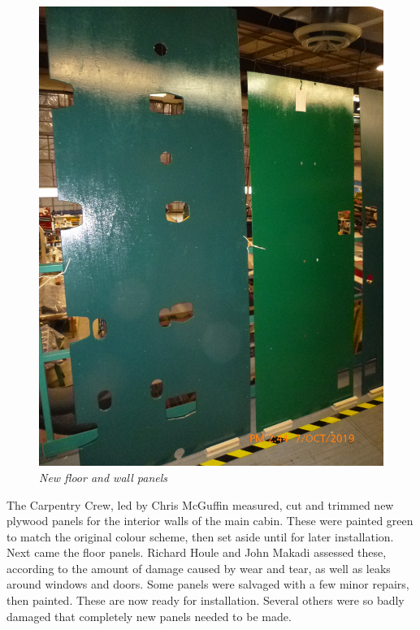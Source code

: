\begin{figure}[httb]
   \vspace{2em}
   \centering
   \includegraphics [scale=0.5]{New-Floor-Wall-Panels-feb-2020.png}
   \caption*{\small \em New floor and wall panels}
   \label{fig:wall-two}
\end{figure}

The Carpentry Crew, led by Chris McGuffin measured, cut and trimmed new
plywood panels for the interior walls of the main cabin.  These were
painted green to match the original colour scheme, then set aside until
for later installation.  Next came the floor panels.  Richard Houle and
John Makadi assessed these, according to the amount of damage caused by
wear and tear, as well as leaks around windows and doors.  Some panels
were salvaged with a few minor repairs, then painted. These are now
ready for installation.  Several others were so badly damaged that
completely new panels needed to be made. 

